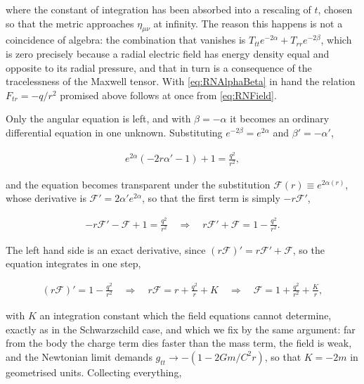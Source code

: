         where the constant of integration has been absorbed into a rescaling of $t$, chosen so that the metric approaches $\eta_{\mu\nu}$ at infinity. The reason this happens is not a coincidence of algebra: the combination that vanishes is $T_{tt}e^{-2\alpha} + T_{rr}e^{-2\beta}$, which is zero precisely because a radial electric field has energy density equal and opposite to its radial pressure, and that in turn is a consequence of the tracelessness of the Maxwell tensor. With \ref{eq:RNAlphaBeta} in hand the relation $F_{tr}=-q/r^2$ promised above follows at once from \ref{eq:RNField}.

        Only the angular equation is left, and with $\beta=-\alpha$ it becomes an ordinary differential equation in one unknown. Substituting $e^{-2\beta}=e^{2\alpha}$ and $\beta'=-\alpha'$,

        \begin{align*}
            e^{2\alpha}\left(-2r\alpha' - 1\right) + 1 = \frac{q^2}{r^2},
        \end{align*}

        and the equation becomes transparent under the substitution $\mathcal{F}(r) \equiv e^{2\alpha(r)}$, whose derivative is $\mathcal{F}' = 2\alpha'e^{2\alpha}$, so that the first term is simply $-r\mathcal{F}'$,

        \begin{align*}
            -r\mathcal{F}' - \mathcal{F} + 1 = \frac{q^2}{r^2} \quad\Longrightarrow\quad r\mathcal{F}' + \mathcal{F} = 1 - \frac{q^2}{r^2}.
        \end{align*}

        The left hand side is an exact derivative, since $\left(r\mathcal{F}\right)' = r\mathcal{F}' + \mathcal{F}$, so the equation integrates in one step,

        \begin{align*}
            \left(r\mathcal{F}\right)' = 1 - \frac{q^2}{r^2} \quad\Longrightarrow\quad r\mathcal{F} = r + \frac{q^2}{r} + K \quad\Longrightarrow\quad \mathcal{F} = 1 + \frac{q^2}{r^2} + \frac{K}{r},
        \end{align*}

        with $K$ an integration constant which the field equations cannot determine, exactly as in the Schwarzschild case, and which we fix by the same argument: far from the body the charge term dies faster than the mass term, the field is weak, and the Newtonian limit demands $g_{tt}\rightarrow -(1-2Gm/C^2r)$, so that $K=-2m$ in geometrised units. Collecting everything,

